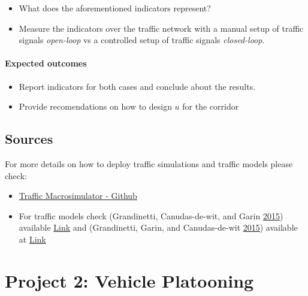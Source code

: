 \documentclass[]{book}
\theoremstyle{definition}
\theoremstyle{definition}
\theoremstyle{definition}
\theoremstyle{remark}
\begin{document}
\begin{itemize}
\item
  What does the aforementioned indicators represent?
\item
  Measure the indicators over the traffic network with a manual setup of
  traffic signals \emph{open-loop} vs a controlled setup of traffic
  signals \emph{closed-loop}.
\end{itemize}

\hypertarget{expected-outcomes-3}{%
\subsubsection*{Expected outcomes}\label{expected-outcomes-3}}

\begin{itemize}
\item
  Report indicators for both cases and conclude about the results.
\item
  Provide recomendations on how to design \(u\) for the corridor
\end{itemize}

\hypertarget{sources}{%
\section*{Sources}\label{sources}}

For more details on how to deploy traffic simulations and traffic models
please check:

\begin{itemize}
\item
  \href{https://github.com/andres-ladino-ifsttar/traffic-macrosimulator}{Traffic
  Macrosimulator - Github}
\item
  For traffic models check (Grandinetti, Canudas-de-wit, and Garin
  \protect\hyperlink{ref-Grandinetti2015}{2015}) available
  \href{https://hal.archives-ouvertes.fr/hal-01188535}{Link} and
  (Grandinetti, Garin, and Canudas-de-wit
  \protect\hyperlink{ref-Grandinetti2016}{2015}) available at
  \href{https://hal.archives-ouvertes.fr/hal-01188811}{Link}
\end{itemize}

\hypertarget{project-2-vehicle-platooning}{%
\chapter*{Project 2: Vehicle
Platooning}\label{project-2-vehicle-platooning}}
\end{document}
